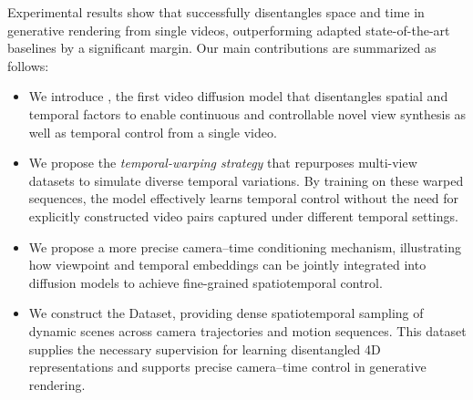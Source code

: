 Experimental results show that \nameMethod successfully disentangles space and time in generative rendering from single videos, outperforming adapted state-of-the-art baselines by a significant margin. 
Our main contributions are summarized as follows:
\begin{itemize}
\item	We introduce \nameMethod, the first video diffusion model that disentangles spatial and temporal factors to enable continuous and controllable novel view synthesis as well as temporal control from a single video.
\item  We propose the \textit{temporal-warping strategy} that repurposes multi-view datasets to simulate diverse temporal variations. By training on these warped sequences, the model effectively learns temporal control without the need for explicitly constructed video pairs captured under different temporal settings.
\item	We propose a more precise camera–time conditioning mechanism, illustrating how viewpoint and temporal embeddings can be jointly integrated into diffusion models to achieve fine-grained spatiotemporal control.
\item	We construct the \nameDataset Dataset, providing dense spatiotemporal sampling of dynamic scenes across camera trajectories and motion sequences. This dataset supplies the necessary supervision for learning disentangled 4D representations and supports precise camera–time control in generative rendering.
\end{itemize}
